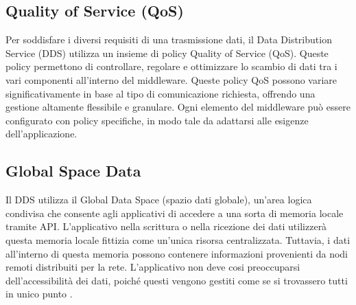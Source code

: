  
\subsection{Quality of Service (QoS)}

Per soddisfare i diversi requisiti di una trasmissione dati, 
il Data Distribution Service (DDS) utilizza un insieme di policy
Quality of Service (QoS). Queste policy permettono di controllare, 
regolare e ottimizzare lo scambio di dati tra i vari componenti 
all'interno del middleware. Queste policy QoS possono variare 
significativamente in base al tipo di comunicazione richiesta, 
offrendo una gestione altamente flessibile e granulare. 
Ogni elemento del middleware può essere configurato 
con policy specifiche, in modo tale da adattarsi alle 
esigenze dell'applicazione.

\subsection{Global Space Data}
Il DDS utilizza il Global Data 
Space (spazio dati globale), un'area logica condivisa 
che consente agli applicativi
di accedere a una sorta di memoria locale tramite API.
L'applicativo nella scrittura o nella ricezione dei dati utilizzerà 
questa memoria locale fittizia come un'unica risorsa centralizzata.
Tuttavia, i dati all'interno di questa memoria possono contenere
informazioni provenienti da nodi remoti distribuiti per la rete. 
L'applicativo non deve cosi preoccuparsi dell'accessibilità dei dati,
poiché questi vengono gestiti come se si trovassero tutti in unico punto 
\cite{whatisdds}.


